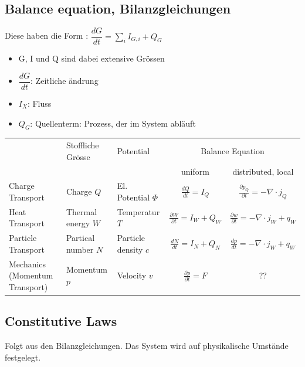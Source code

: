 \documentclass[a4paper, 10pt]{scrartcl}
\begin{document}
	\subsection{Balance equation, Bilanzgleichungen}
	\begin{multicols}{2}
		Diese haben die Form :	
		$\dfrac{dG}{dt} = \sum\limits_{i} I_{G,i} + Q_G$
		
		\columnbreak 
		\begin{itemize}
			\item G, I und Q sind dabei extensive Grössen
			
			\item $\dfrac{dG}{dt}$: Zeitliche ändrung
			
			\item $I_X$: Fluss
			
			\item $Q_G$: Quellenterm: Prozess, der im System abläuft
		\end{itemize}
	\end{multicols}
	
	
	{
		\begin{tabularx}{\linewidth}{XXXcc}
			\toprule
			& Stoffliche Grösse & Potential & \multicolumn{2}{c}{Balance Equation} \\
			& & & uniform & distributed, local \\ \midrule
			Charge Transport & Charge $Q$ & El. Potential $\Phi$ & $\frac{dQ}{dt}=I_Q$ & $ \frac{\partial p_Q}{\partial t}=-\nabla\cdot j_Q$ \\ \hline
			Heat Transport & Thermal energy \newline $W$ & Temperatur $T$ & $\frac{\partial W}{\partial t}= I_W+Q_W$ & $\frac{\partial w}{\partial t}= -\nabla \cdot j_W+q_W$  \\ \hline
			Particle Transport & Partical number \newline $N$ & Particle density \newline $c$ & $\frac{dN}{dt}=I_N+Q_N$ & $\frac{dp}{dt}=-\nabla \cdot j_W +q_W$ \\ \hline
			Mechanics (Momentum Transport) & Momentum $p$ & Velocity $v$  & $\frac{\partial p}{\partial t}=F$ & ?? \\ 
			\bottomrule
		\end{tabularx} }
		
		\subsection{Constitutive Laws}
		Folgt aus den Bilanzgleichungen. Das System wird auf physikalische Umstände festgelegt.
		
\end{document}
